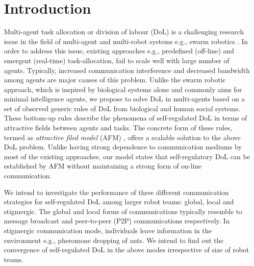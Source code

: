 \documentclass{llncs}
\begin{document}
\section{Introduction}
\label{sec:intro}
\vspace{2mm}
Multi-agent task allocation or division of labour (DoL) is a challenging research issue in the field of multi-agent and multi-robot systems e.g., swarm robotics \cite{RefSwarm}. In order to address this issue, existing approaches e.g., predefined (off-line) and emergent (real-time) task-allocation, fail to scale well with large number of agents. Typically, increased communication interference and decreased bandwidth among agents are major causes of this problem. Unlike the swarm robotic approach, which is inspired by biological systems alone and commonly aims for minimal intelligence agents, we propose to solve DoL in multi-agents based on a set of observed generic rules of DoL from biological and human social systems. These bottom-up rules describe the phenomena of self-regulated DoL in terms of attractive fields between agents and tasks. The concrete form of these rules, termed as \textit{attractive filed model} (AFM) \cite{RefElsa}, offers a scalable solution to the above DoL problem. Unlike having strong dependence to communication mediums by most of the existing approaches, our model states that self-regulatory DoL can be established by AFM without maintaining a strong form of on-line communication. 

\vspace{4mm}
We intend to investigate the performance of three different communication strategies for self-regulated DoL among larger robot teams: global, local and stigmergic. The global and local forms of communications typically resemble to message broadcast and peer-to-peer (P2P) communications respectively. In stigmergic communication mode, individuals leave information in the environment e.g., pheromone dropping of ants. We intend to find out the convergence of self-regulated DoL in the above modes irrespective of size of robot teams.
%
\end{document}
